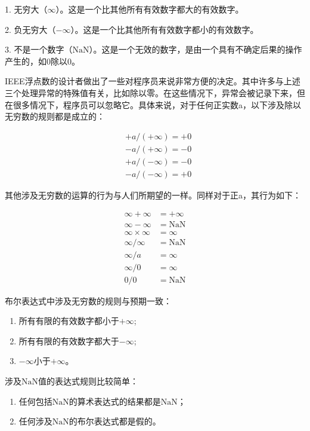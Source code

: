 \documentclass[lang=cn,10pt]{elegantbook}
\begin{document}
1. 无穷大（$\infty$）。这是一个比其他所有有效数字都大的有效数字。

2. 负无穷大（$-\infty$）。这是一个比其他所有有效数字都小的有效数字。

3. 不是一个数字（$\mathrm{NaN}$）。这是一个无效的数字，是由一个具有不确定后果的操作产生的，如0除以0。

IEEE浮点数的设计者做出了一些对程序员来说非常方便的决定。其中许多与上述三个处理异常的特殊值有关，比如除以零。在这些情况下，异常会被记录下来，但在很多情况下，程序员可以忽略它。具体来说，对于任何正实数a，以下涉及除以无穷数的规则都是成立的：

\[
  \begin{aligned}
  &+a /(+\infty)=+0 \\
  &-a /(+\infty)=-0 \\
  &+a /(-\infty)=-0 \\
  &-a /(-\infty)=+0
  \end{aligned}
\]

其他涉及无穷数的运算的行为与人们所期望的一样。同样对于正a，其行为如下：

\[
  \begin{aligned}
  \infty+\infty &=+\infty \\
  \infty-\infty &=\mathrm{NaN} \\
  \infty \times \infty &=\infty \\
  \infty / \infty &=\mathrm{NaN} \\
  \infty / a &=\infty \\
  \infty / 0 &=\infty \\
  0 / 0 &=\mathrm{NaN}
  \end{aligned}
\]

布尔表达式中涉及无穷数的规则与预期一致：

\begin{enumerate}
  \item 所有有限的有效数字都小于$+\infty$;
  \item 所有有限的有效数字都大于$-\infty$;
  \item $-\infty$小于$+\infty$。
\end{enumerate}

涉及$\mathrm{NaN}$值的表达式规则比较简单：

\begin{enumerate}
  \item 任何包括$\mathrm{NaN}$的算术表达式的结果都是$\mathrm{NaN}$；
  \item 任何涉及$\mathrm{NaN}$的布尔表达式都是假的。
\end{enumerate}
\end{document}
